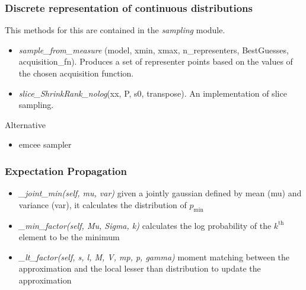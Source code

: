 \documentclass[10pt,handout]{beamer}
\begin{document}
\begin{frame}
\frametitle{Discrete representation of continuous distributions}

This methods for this are contained in the \emph{sampling} module.

\begin{itemize}
  \item \emph{sample\_from\_measure}
  (model, xmin, xmax, n\_representers, BestGuesses, acquisition\_fn). Produces 
  a set of representer points based on the values of the chosen acquisition 
  function.
  
  \item \emph{slice\_ShrinkRank\_nolog}(xx, P, s0, transpose). An implementation
  of slice sampling.
\end{itemize}

Alternative 

\begin{itemize}
\item emcee sampler
\end{itemize}

\end{frame}

\begin{frame}
\frametitle{Expectation Propagation}

\begin{itemize}
  \item\emph{\_joint\_min(self, mu, var)}
  given a jointly gaussian defined by mean (mu) and  variance (var), it calculates the distribution of $p_\text{min}$ 
  \item\emph{\_min\_factor(self, Mu, Sigma, k)}
  calculates the log probability of the $k^\text{th}$ element to be the minimum
  \item\emph{\_lt\_factor(self, s, l, M, V, mp, p, gamma)}
  moment matching between the approximation and the local lesser than distribution to update the approximation
\end{itemize}


\end{frame}
\end{document}
